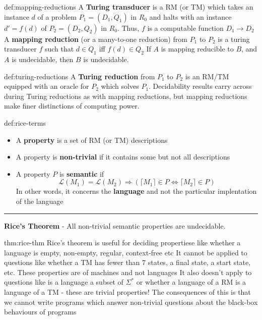 \documentclass[landscape, 8pt]{extarticle}
\begin{document}
\begin{multicols}{3}
\begin{dfn}{def:mapping-reductions}{}
A \textbf{Turing transducer} is a RM (or TM) which takes an instance $d$ of a problem $P_{1} = (D_{1}, Q_{1})$ in $R_{0}$ and halts with an instance $d' = f(d)$ of $P_{2} = (D_{2}, Q_{2})$ in $R_{0}$. Thus, $f$ is a computable function $D_{1}\to D_{2}$\newline
A \textbf{mapping reduction} (or a many-to-one reduction) from $P_{1}$ to $P_{2}$ is a turing transducer $f$ such that $d\in Q_{1}$ iff $f(d)\in Q_{2}$
\newline
If $A$ is mapping reducible to $B$, and $A$ is undecidable, then $B$ is undecidable.
\end{dfn}

\begin{dfn}{def:turing-reductions}{}
A \textbf{Turing reduction} from $P_{1}$ to $P_{2}$ is an RM/TM equipped with an oracle for $P_{2}$ which solves $P_{1}$.\newline
Decidability results carry across during Turing reductions as with mapping reductions, but mapping reductions make finer distinctions of computing power.
\end{dfn}

\begin{thm}{def:rice-terms}{}
\renewcommand\labelitemi{\tiny$\bullet$}
\begin{itemize}
    \setlength\itemsep{0em}
    \item A \textbf{property} is a set of RM (or TM) descriptions
    \item A property is \textbf{non-trivial} if it contains some but not all descriptions
    \item A property $P$ is \textbf{semantic} if
    \[\mathcal{L}(M_{1}) =\mathcal{L}(M_{2}) \Rightarrow (\lceil M_{1} \rceil \in P \Leftrightarrow \lceil M_{2} \rceil \in P)\]
    In other words, it concerns the \textbf{language} and not the particular implentation of the language
\end{itemize}
\noindent\rule{\textwidth}{0.2pt}
\textbf{Rice's Theorem} - All non-trivial semantic properties are undecidable.\end{thm}

\begin{thm}{thm:rice-thm}{}
Rice's theorem is useful for deciding propertiese like whether a language is empty, non-empty, regular, context-free etc\newline
It cannot be applied to questions like whether a TM has fewer than $7$ states, a final state, a start state, etc. These properties are of machines and not languages\newline
It also doesn't apply to questions like is a language a subset of $\Sigma^{*}$ or whether a language of a RM is a language of a TM - these are trivial properties!
The consequences of this is that we cannot write programs which answer non-trivial questions about the black-box behaviours of programs
\end{thm}


\end{multicols}
\end{document}
